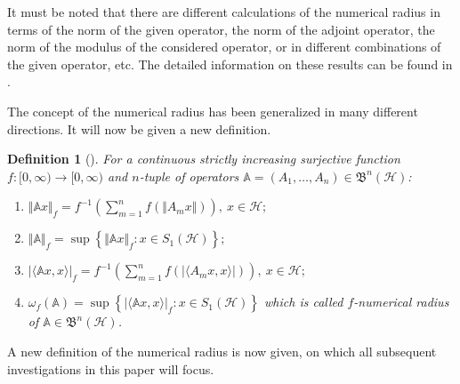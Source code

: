 \documentclass[12pt]{article}
\newtheorem{definition}{Definition}
\begin{document}
It must be noted that there are different calculations of the numerical radius in terms of the norm of the given operator, the norm of the adjoint operator, the norm of the modulus of the considered operator, or in different combinations of the given operator, etc.  The detailed information on these results can be found in \cite{AbuOmar2019,Bourhim2017,Halmos1982,Moradi2021,Moradi2021b,Moslehian2017,Omidvar2020,Omidvar2021,Sababheh2019,SababhehMoradi2021,Sheikhhosseini2022,Shebrawi2023,Yamazaki2007}.


The concept of the numerical radius has been generalized in many different directions. It will now be given a new definition.
\begin{definition} [\!\!\cite{Alomari2024}]
\label{def5}
For a continuous strictly increasing surjective function $ f:[0,\infty)\rightarrow [0,\infty) $ and $n$-tuple of operators $\mathbb{A} = (A_{1}, \ldots, A_{n}) \in \mathfrak{B}^{n}(\mathcal{H})$\textnormal{:}
\begin{enumerate}[label=\upshape{\arabic*.}, ref=\upshape{\arabic*}, labelindent=5pt, leftmargin=*]
    \item $ \Vert \mathbb{A}x \Vert_{f}= f^{-1}\left( \sum\limits_{m=1}^{n}f\left( \Vert A_{m}x \Vert \right)  \right) , \ x\in \mathcal{H}; $
    \item  $ \Vert \mathbb{A} \Vert_{f}= \sup \left\lbrace \Vert \mathbb{A}x \Vert_{f}: x\in S_{1}(\mathcal{H})  \right\rbrace ; $
    \item $ \vert \langle \mathbb{A}x, x \rangle   \vert_{f} = f^{-1} \left( \sum\limits_{m=1}^{n}f\left( \vert \langle A_{m}x,x\rangle \vert \right)  \right), \ x\in \mathcal{H};  $
    \item
    $
    \omega_{f}(\mathbb{A})=\sup\left\lbrace \vert \langle \mathbb{A} x,x \rangle \vert_{f} : x\in S_{1} (\mathcal{H}) \right\rbrace
    $
which is called $f$-numerical radius of $ \mathbb{A}\in \mathfrak{B}^{n}(\mathcal{H})$.
    \end{enumerate}
\end{definition}


A new definition of the numerical radius is now given, on which all subsequent investigations in this paper will focus.
\end{document}
